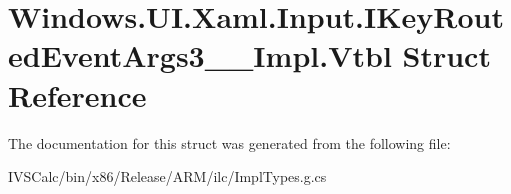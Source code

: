 \hypertarget{struct_windows_1_1_u_i_1_1_xaml_1_1_input_1_1_i_key_routed_event_args3_____impl_1_1_vtbl}{}\section{Windows.\+U\+I.\+Xaml.\+Input.\+I\+Key\+Routed\+Event\+Args3\+\_\+\+\_\+\+Impl.\+Vtbl Struct Reference}
\label{struct_windows_1_1_u_i_1_1_xaml_1_1_input_1_1_i_key_routed_event_args3_____impl_1_1_vtbl}


The documentation for this struct was generated from the following file\+:\begin{DoxyCompactItemize}
\item 
I\+V\+S\+Calc/bin/x86/\+Release/\+A\+R\+M/ilc/Impl\+Types.\+g.\+cs\end{DoxyCompactItemize}
